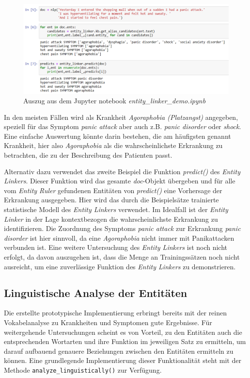\begin{figure}[h]
    \centering
    \includegraphics[width=\textwidth]{pictures/EntityLinkerDemo.png}
    \caption{Auszug aus dem Jupyter notebook \emph{entity\_linker\_demo.ipynb}}
    \label{fig:jupyter}
\end{figure}

In den meisten Fällen wird als Krankheit \emph{Agoraphobia (Platzangst)} angegeben, speziell für das Symptom \emph{panic attack} aber auch z.B. \emph{panic disorder} oder \emph{shock}. Eine einfache Auswertung könnte darin bestehen, die am häufigsten genannt Krankheit, hier also \emph{Agoraphobia} als die wahrscheinlichste Erkrankung zu betrachten, die zu der Beschreibung des Patienten passt.

Alternativ dazu verwendet das zweite Beispiel die Funktion \emph{predict()} des \emph{Entity Linkers}. Dieser Funktion wird das gesamte \emph{doc}-Objekt übergeben und für alle vom \emph{Entity Ruler} gefundenen Entitäten von \emph{predict()} eine Vorhersage der Erkrankung ausgegeben. Hier wird das durch die Beispielsätze trainierte statistische Modell des \emph{Entity Linkers} verwendet. Im Idealfall ist der \emph{Entity Linker} in der Lage kontextbezogen die wahrscheinlichste Erkrankung zu identifizieren. Die Zuordnung des Symptoms \emph{panic attack} zur Erkrankung \emph{panic disorder} ist hier sinnvoll, da eine \emph{Agoraphobia} nicht immer mit Panikattacken verbunden ist. Eine weitere Untersuchung des \emph{Entity Linkers} ist noch nicht erfolgt, da davon auszugehen ist, dass die Menge an Trainingssätzen noch nicht ausreicht, um eine zuverlässige Funktion des \emph{Entity Linkers} zu demonstrieren.

\subsection{Linguistische Analyse der Entitäten}

Die erstellte prototypische Implementierung erbringt bereits mit der reinen Vokabelanalyse zu Krankheiten und Symptomen gute Ergebnisse. Für weitergehende Untersuchungen scheint es von Vorteil, zu den Entitäten auch die entsprechenden Wortarten und ihre Funktion im jeweiligen Satz zu ermitteln, um darauf aufbauend genauere Beziehungen zwischen den Entitäten ermitteln zu können. Eine grundlegende Implementierung dieser Funktionalität steht mit der Methode \lstinline{analyze_linguistically()} zur Verfügung.

